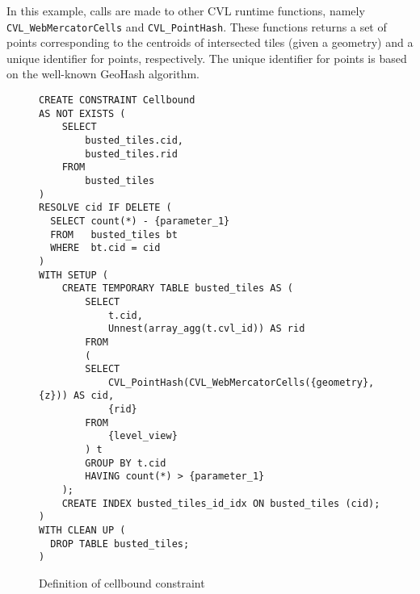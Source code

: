 In this example, calls are made to other CVL runtime functions, namely \texttt{CVL\_WebMercatorCells} and \texttt{CVL\_PointHash}. These functions returns a set of points corresponding to the centroids of intersected tiles (given a geometry) and a unique identifier for points, respectively. The unique identifier for points is based on the well-known GeoHash algorithm.

\begin{figure}[htbp]
\begin{center}
\begin{lstlisting}
CREATE CONSTRAINT Cellbound
AS NOT EXISTS (
    SELECT
        busted_tiles.cid,
        busted_tiles.rid
    FROM
        busted_tiles
)
RESOLVE cid IF DELETE (
  SELECT count(*) - {parameter_1}
  FROM   busted_tiles bt
  WHERE  bt.cid = cid
)
WITH SETUP (
    CREATE TEMPORARY TABLE busted_tiles AS (
        SELECT
            t.cid,
            Unnest(array_agg(t.cvl_id)) AS rid
        FROM
        (
        SELECT
            CVL_PointHash(CVL_WebMercatorCells({geometry}, {z})) AS cid,
            {rid}
        FROM
            {level_view}
        ) t
        GROUP BY t.cid
        HAVING count(*) > {parameter_1}
    );
    CREATE INDEX busted_tiles_id_idx ON busted_tiles (cid);
)
WITH CLEAN UP (
  DROP TABLE busted_tiles;
)
\end{lstlisting}
\caption{Definition of cellbound constraint}
\label{fig:cellbound-definition}
\end{center}
\end{figure}


